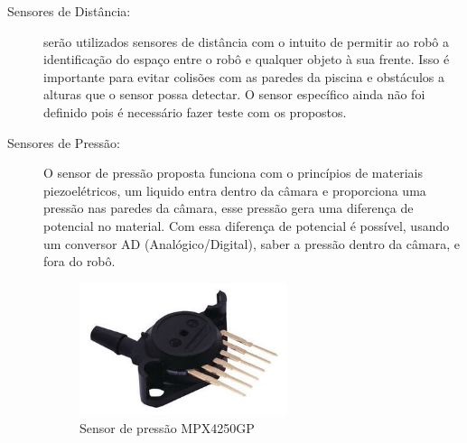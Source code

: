 \begin{description}
\item[Sensores de Distância:] serão utilizados sensores de distância com o
intuito de permitir ao robô a identificação do espaço entre o robô e qualquer
objeto à sua frente. Isso é importante para evitar colisões com as paredes da
piscina e obstáculos a alturas que o sensor possa detectar. O sensor específico
ainda não foi definido pois é necessário fazer teste com os propostos.

\item[Sensores de Pressão:] O sensor de pressão proposta funciona com o
princípios de materiais piezoelétricos, um liquido entra dentro da câmara
e proporciona uma pressão nas paredes da câmara, esse pressão gera uma
diferença de potencial no material. Com essa diferença de potencial é
possível, usando um conversor AD (Analógico/Digital), saber a pressão dentro
da câmara, e fora do robô.
\par
\begin{figure}[h]
  \centering
  \includegraphics[width=0.6\textwidth]{figures/pressure-sensor.png}
  \caption{Sensor de pressão MPX4250GP \cite{octopart2016}}
  \label{fig:pressure-sensor}
\end{figure}
\FloatBarrier


\end{description}
